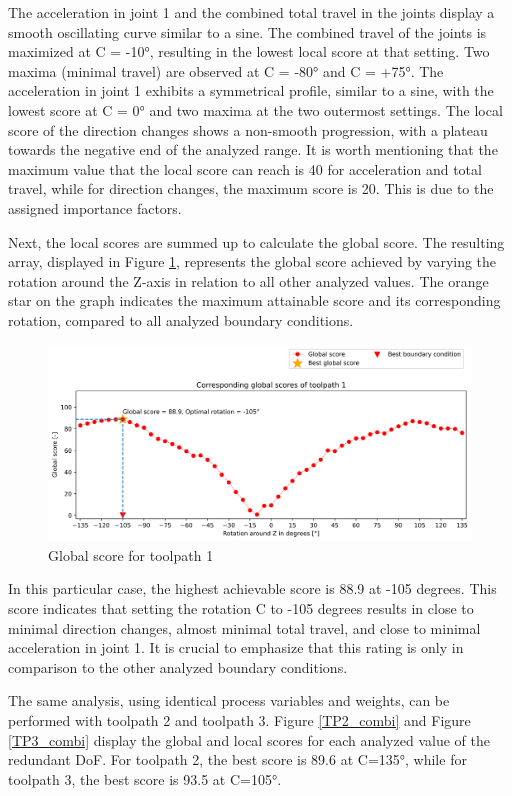 The acceleration in joint 1 and the combined total travel in the joints display a smooth oscillating curve similar to a sine. The combined travel of the joints is maximized at C = -10°, resulting in the lowest local score at that setting. Two maxima (minimal travel) are observed at C = -80° and C = +75°. The acceleration in joint 1 exhibits a symmetrical profile, similar to a sine, with the lowest score at C = 0° and two maxima at the two outermost settings. The local score of the direction changes shows a non-smooth progression, with a plateau towards the negative end of the analyzed range.
It is worth mentioning that the maximum value that the local score can reach is 40 for acceleration and total travel, while for direction changes, the maximum score is 20. This is due to the assigned importance factors. 

Next, the local scores are summed up to calculate the global score. The resulting array, displayed in Figure \ref{GS1}, represents the global score achieved by varying the rotation around the Z-axis in relation to all other analyzed values. The orange star on the graph indicates the maximum attainable score and its corresponding rotation, compared to all analyzed boundary conditions.

\begin{figure}[H]
	\centerline{\includegraphics[width=1\textwidth]{figures/best_c_1.png}}
	\caption{Global score for toolpath 1}
	\label{GS1}
\end{figure}
In this particular case, the highest achievable score is 88.9 at -105 degrees. This score indicates that setting the rotation C to -105 degrees results in close to minimal direction changes, almost minimal total travel, and close to minimal acceleration in joint 1. It is crucial to emphasize that this rating is only in comparison to the other analyzed boundary conditions.

The same analysis, using identical process variables and weights, can be performed with toolpath 2 and toolpath 3. Figure \ref{TP2_combi} and Figure \ref{TP3_combi} display the global and local scores for each analyzed value of the redundant \acrshort{DoF}. For toolpath 2, the best score is 89.6 at C=135°, while for toolpath 3, the best score is 93.5 at C=105°.


